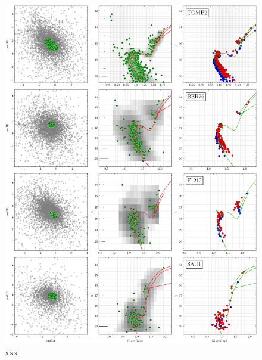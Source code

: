 \documentclass[draft]{aa}
\begin{document}
\begin{appendix}
 \begin{figure}
  \centering
  \includegraphics[height=.95\textheight]{figs/4_fpars.png}
  \caption{xxx}
  \label{fig:4fpars}
 \end{figure}


\end{appendix}
\end{document}
